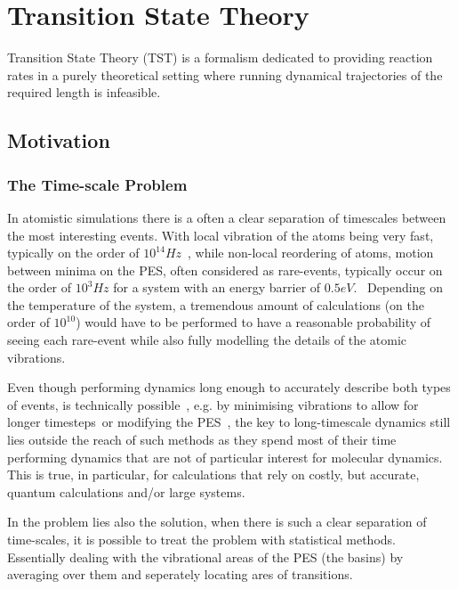 \section{Transition State Theory}
\label{sec:tst}

Transition State Theory (TST) is a formalism dedicated to providing reaction rates in a purely theoretical setting where running dynamical trajectories of the required length is infeasible.

\incomplete

\subsection{Motivation}

\subsubsection{The Time-scale Problem}


In atomistic simulations there is a often a clear separation of timescales between the most interesting events.
With local vibration of the atoms being very fast, typically on the order of $10^{14} \unit{Hz}$~\citemiss,
while non-local reordering of atoms, motion between minima on the PES, often considered as rare-events, typically occur on the order of $10^3 \unit{Hz}$ for a system with an energy barrier of $0.5 \unit{eV}$.~\citemiss
Depending on the temperature of the system, a tremendous amount of calculations (on the order of $10^10$) would have to be performed to have a reasonable probability of seeing each rare-event while also fully modelling the details of the atomic vibrations.

Even though performing dynamics long enough to accurately describe both types of events, is technically possible~\citemiss, e.g. by minimising vibrations to allow for longer timesteps~\citemiss or modifying the PES~\cite{hyperdynamics-voter-1997}, the key to long-timescale dynamics still lies outside the reach of such methods as they spend most of their time performing dynamics that are not of particular interest for molecular dynamics.
This is true, in particular, for calculations that rely on costly, but accurate, quantum calculations and/or large systems.

In the problem lies also the solution, when there is such a clear separation of time-scales, it is possible to treat the problem with statistical methods.
Essentially dealing with the vibrational areas of the PES (the basins) by averaging over them and seperately locating ares of transitions.

